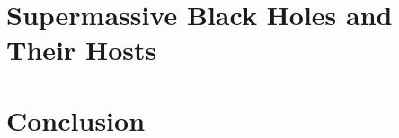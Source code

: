 \documentclass[12pt]{report}
\begin{document}
\chapter{Supermassive Black Holes and Their Hosts}
\label{chap:smbhs}








\chapter{Conclusion}
\label{chap:conclusion}




\singlespacing
%


\end{document}
